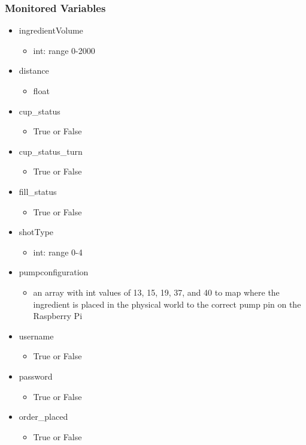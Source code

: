 \documentclass{article}
\begin{document}
\subsubsection{Monitored Variables} %
    \begin{itemize}
        \item ingredientVolume
        \begin{itemize}
            \item int: range 0-2000
        \end{itemize}
        \item distance
        \begin{itemize}
            \item float
        \end{itemize}
        \item cup\_status
        \begin{itemize}
            \item True or False
        \end{itemize}
        \item cup\_status\_turn
        \begin{itemize}
            \item True or False
        \end{itemize}
        \item fill\_status
        \begin{itemize}
            \item True or False
        \end{itemize}
        \item shotType
        \begin{itemize}
            \item int: range 0-4
        \end{itemize}
        \item pumpconfiguration
        \begin{itemize}
            \item an array with int values of 13, 15, 19, 37, and 40 to map where the ingredient is placed in the physical world to the correct pump pin on the Raspberry Pi
        \end{itemize}
        \item username
        \begin{itemize}
            \item True or False
        \end{itemize}
        \item password
        \begin{itemize}
            \item True or False
        \end{itemize}
        \item order_placed
        \begin{itemize}
            \item True or False
        \end{itemize}
 \end{itemize}
    
\end{document}
